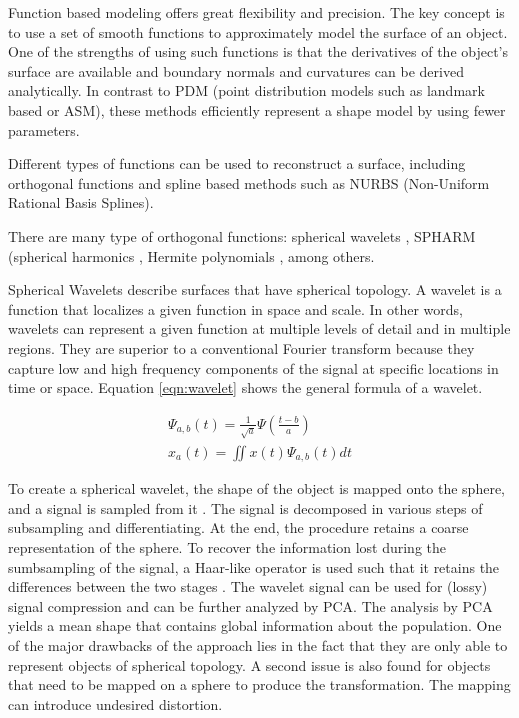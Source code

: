 Function based modeling offers great flexibility and precision. 
The key concept is to use a set of smooth functions to approximately model the surface of an object.
One of the strengths of using such functions is that the derivatives of the object's surface are available and 
boundary normals and curvatures can be derived analytically. 
In contrast to PDM (point distribution models such as landmark based or ASM), these methods efficiently represent
a shape model by using fewer parameters.

Different types of functions can be used to reconstruct a surface, including 
orthogonal functions and spline based methods such as NURBS (Non-Uniform Rational Basis Splines).

There are many type of orthogonal functions: spherical wavelets \cite{schroder1995spherical}, 
SPHARM (spherical harmonics \cite{brechbuhler1995parametrization}, 
Hermite polynomials \cite{bradley1997geometric}, among others.

Spherical Wavelets describe surfaces that have spherical topology.
A wavelet is a function that localizes a given function in space and scale.
In other words, wavelets can represent a given function at multiple levels of detail
and in multiple regions. 
They are superior to a conventional Fourier transform
because they capture 
low and high frequency components of the signal at
specific locations in time or space.
Equation \ref{eqn:wavelet} shows the general formula of a wavelet.

\begin{eqnarray}
 \Psi_{a, b}(t) = \frac{1}{\sqrt{a}}\Psi(\frac{t - b}{a}) \\
 x_a(t) = \iint x(t) \Psi_{a, b}(t)dt
 \label{eqn:wavelet}
\end{eqnarray}

To create a spherical wavelet, the shape of the object is mapped onto the sphere,
and a signal is sampled from it \cite{schroder1995spherical}.
The signal is decomposed in various steps of subsampling and differentiating.
At the end, the procedure retains a coarse representation of the sphere. 
To recover the information lost during the sumbsampling of the signal, a Haar-like operator
is used such that it retains the differences between the two stages \cite{schwartz2008tr}.
The wavelet signal can be used for (lossy) signal compression and can be further analyzed
by PCA. The analysis by PCA yields a mean shape that contains global information 
about the population. 
One of the major drawbacks of the approach lies in the fact that they are only able to represent 
objects of spherical topology. 
A second issue is also found for objects that need to be mapped 
on a sphere to produce the transformation. The mapping can introduce undesired distortion. 


